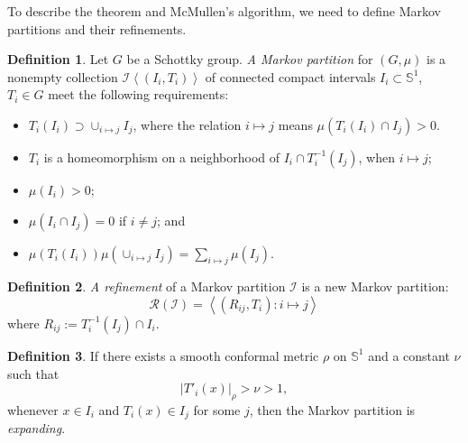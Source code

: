 \documentclass[12pt,oneside]{sfsuthesis}
\theoremstyle{plain} %
\theoremstyle{definition}  %
\newtheorem{definition}{Definition}[chapter]
\theoremstyle{remark}  %
\theoremstyle{plain}
\begin{document}
{To describe the theorem and McMullen's algorithm, we need to define Markov partitions and their refinements.
\begin{definition}
Let $G$ be a Schottky group. \textit{A Markov partition} for $(G,\mu)$ is a nonempty collection $\mathcal{I}\left\langle (I_i,T_i) \right\rangle$ of connected compact intervals $I_i\subset \mathbb{S}^1$, $T_i\in G$ meet the following requirements:
\begin{itemize}
\item $T_i(I_i)\supset \cup_{i\mapsto j}I_j$, where the relation $i\mapsto j$ means $\mu\left(T_i(I_i)\cap I_j \right)>0$.
\item $T_i$ is a homeomorphism on a neighborhood of $I_i\cap T_i^{-1}(I_j)$, when $i\mapsto j$;
\item $\mu(I_i)>0$;
\item $\mu(I_i\cap I_j)=0$ if $i\neq j$; and
\item $\mu(T_i(I_i))\mu(\cup_{i\mapsto j}I_j)=\sum_{i\mapsto j}\mu (I_j).$
\end{itemize}
\end{definition}
\begin{definition}
\textit{A refinement} of a Markov partition $\mathcal{I}$ is a new Markov partition:
$$
\mathcal{R}(\mathcal{I})=\left\langle (R_{ij},T_i):i\mapsto j \right\rangle
$$ 
where $R_{ij}:=T_i^{-1}(I_j)\cap I_i$.
\end{definition}


\begin{definition}
If there exists a smooth conformal metric $\rho$ on $\mathbb{S}^1$ and a constant $\nu$ such that
$$
\vert T'_{i}(x)\vert_\rho>\nu>1,
$$
whenever $x\in I_i$ and $T_i(x)\in I_j$ for some $j$, then the Markov partition is \textit{expanding}.
\end{definition}

}
\end{document}
